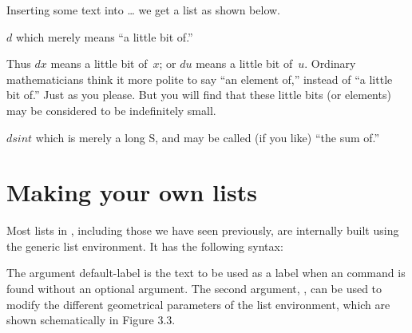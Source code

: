 Inserting some text into  \ldots {} we get a list as shown below. 


\newenvironment{Enumb}
{\begin{list}{(\arabic{enumb})}%
    {\setlength\labelsep{10pt}%
    \setlength\itemindent{10pt}%
    \setlength\leftmargin{10pt}%
    \setlength{}%
    }}%
{\end{list}}



\begin{Enumb}
\item $d$ which merely means ``a little bit of.''

Thus $dx$ means a little bit of~$x$; or $du$ means a
little bit of~$u$. Ordinary mathematicians think it
more polite to say ``an element of,'' instead of ``a little
bit of.'' Just as you please. But you will find that
these little bits (or elements) may be considered to be
indefinitely small.

\item  $ds int$ which is merely a long S, and may be called
(if you like) ``the sum of.''

\end{Enumb}


\section{Making your own lists}

Most lists in \latex, including those we have seen previously, are internally built
using the generic list environment. It has the following syntax:


The argument default-label is the text to be used as a label when an  command
is found without an optional argument. The second argument, , can
be used to modify the different geometrical parameters of the list environment,
which are shown schematically in Figure 3.3.

